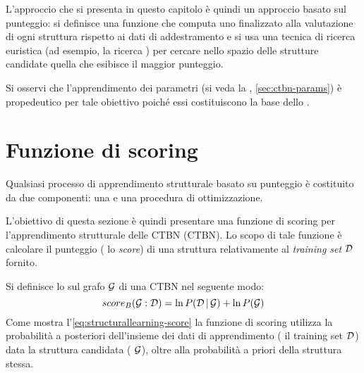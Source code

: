 L'approccio che si presenta in questo capitolo è quindi un approccio basato sul punteggio: si definisce una funzione che computa uno \emph{} finalizzato alla valutazione di ogni struttura rispetto ai dati di addestramento e si usa una tecnica di ricerca euristica (ad esempio, la ricerca \emph{}) per cercare nello spazio delle strutture candidate quella che esibisce il maggior punteggio.

Si osservi che l'apprendimento dei parametri (si veda la , \autoref{sec:ctbn-params}) è propedeutico per tale obiettivo poiché essi costituiscono la base dello .

\cleardoublepage
\section{Funzione di scoring}\label{sec:ctbn-structurallearning-score}
Qualsiasi processo di apprendimento strutturale basato su punteggio è costituito da due componenti: una \emph{} e una procedura di ottimizzazione.

L'obiettivo di questa sezione è quindi presentare una funzione di scoring per l'apprendimento strutturale delle \acl{CTBN} (\acs{CTBN}). Lo scopo di tale funzione è calcolare il punteggio (\ie{} lo \emph{score}) di una struttura relativamente al \emph{training set} $\mathcal{D}$ fornito.

Si definisce lo \emph{} sul grafo $\mathcal{G}$ di una \acs{CTBN} nel seguente modo:
\begin{equation}\label{eq:structurallearning-score}
score_B(\mathcal{G}:\mathcal{D})=\ln{P(\mathcal{D}\,\arrowvert\,\mathcal{G})} + \ln{P(\mathcal{G})}
\end{equation}
Come mostra l'\autoref{eq:structurallearning-score} la funzione di scoring utilizza la probabilità a posteriori dell'insieme dei dati di apprendimento (\ie{} il training set $\mathcal{D}$) data la struttura candidata (\ie{} $\mathcal{G}$), oltre alla probabilità a priori della struttura stessa.

